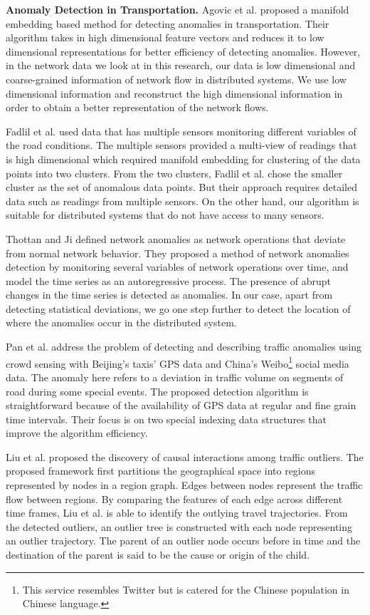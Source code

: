 \documentclass[conference]{IEEEtran.1.8}
\begin{document}
\textbf{Anomaly Detection in Transportation.} Agovic et al. \cite{Agovic2009} proposed a manifold embedding based method for detecting anomalies in transportation. Their algorithm takes in high dimensional feature vectors and reduces it to low dimensional representations for better efficiency of detecting anomalies. However, in the network data we look at in this research, our data is low dimensional and coarse-grained information of network flow in distributed systems. We use low dimensional information and reconstruct the high dimensional information in order to obtain a better representation of the network flows.

Fadlil et al. \cite{Fadlil2013} used data that has multiple sensors monitoring different variables of the road conditions. The multiple sensors provided a multi-view of readings that is high dimensional which required manifold embedding \cite{Agovic2009} for clustering of the data points into two clusters. From the two clusters, Fadlil et al. chose the smaller cluster as the set of anomalous data points. But their approach requires detailed data such as readings from multiple sensors. On the other hand, our algorithm is suitable for distributed systems that do not have access to many sensors.

Thottan and Ji \cite{Thottan2003} defined network anomalies as network operations that deviate from normal network behavior. They proposed a method of network anomalies detection by monitoring several variables of network operations over time, and model the time series as an autoregressive process. The presence of abrupt changes in the time series is detected as anomalies. In our case, apart from detecting statistical deviations, we go one step further to detect the location of where the anomalies occur in the distributed system.

Pan et al. \cite{Pan2013} address the problem of detecting and describing traffic anomalies using crowd sensing with Beijing's taxis' GPS data and China's Weibo\footnote{This service resembles Twitter but is catered for the Chinese population in Chinese language.} social media data. The anomaly here refers to a deviation in traffic volume on segments of road during some special events. The proposed detection algorithm is straightforward because of the availability of GPS data at regular and fine grain time intervals. Their focus is on two special indexing data structures that improve the algorithm efficiency.

Liu et al. \cite{Liu2011} proposed the discovery of causal interactions among traffic outliers. The proposed framework first partitions the geographical space into regions represented by nodes in a region graph. Edges between nodes represent the traffic flow between regions. By comparing the features of each edge across different time frames, Liu et al. is able to identify the outlying travel trajectories. From the detected outliers, an outlier tree is constructed with each node representing an outlier trajectory. The parent of an outlier node occurs before in time and the destination of the parent is said to be the cause or origin of the child.
\end{document}
